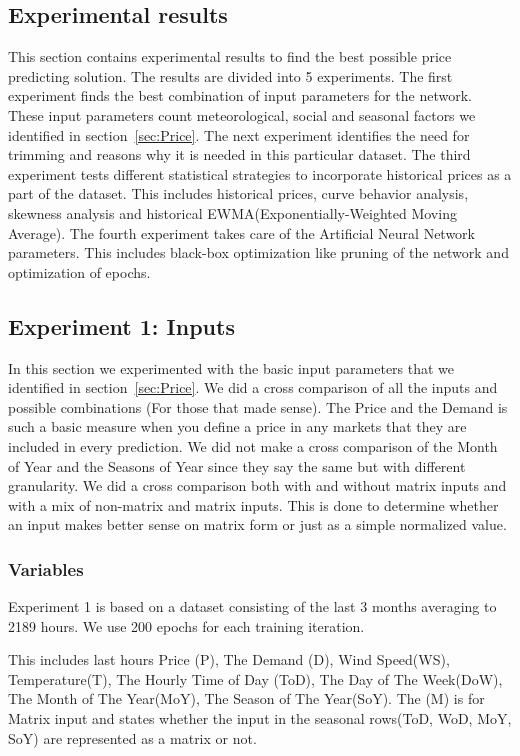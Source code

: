 \subsection{Experimental results}
This section contains experimental results to find the best possible price predicting solution. The results are divided into 5 experiments. The first experiment finds the best combination of input parameters for the network. These input parameters count meteorological, social and seasonal factors we identified in section~\ref{sec:Price}. The next experiment identifies the need for trimming and reasons why it is needed in this particular dataset. The third experiment tests different statistical strategies to incorporate historical prices as a part of the dataset. This includes historical prices, curve behavior analysis, skewness analysis and historical EWMA(Exponentially-Weighted Moving Average). The fourth experiment takes care of the Artificial Neural Network parameters. This includes black-box optimization like pruning of the network and optimization of epochs.

\subsection{Experiment 1: Inputs}
In this section we experimented with the basic input parameters that we identified in section~\ref{sec:Price}. We did a cross comparison of all the inputs and possible combinations (For those that made sense). The Price and the Demand is such a basic measure when you define a price in any markets that they are included in every prediction. We did not make a cross comparison of the Month of Year and the Seasons of Year since they say the same but with different granularity. We did a cross comparison both with and without matrix inputs and with a mix of non-matrix and matrix inputs. This is done to determine whether an input makes better sense on matrix form or just as a simple normalized value. 

\subsubsection{Variables}
Experiment 1 is based on a dataset consisting of the last 3 months averaging to 2189 hours. We use 200 epochs for each training iteration.

This includes last hours Price (P), The Demand (D), Wind Speed(WS), Temperature(T), The Hourly Time of Day (ToD), The Day of The Week(DoW), The Month of The Year(MoY), The Season of The Year(SoY). The (M) is for Matrix input and states whether the input in the seasonal rows(ToD, WoD, MoY, SoY) are represented as a matrix or not.

